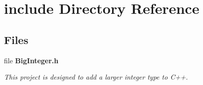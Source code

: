 \section{include Directory Reference}
\label{dir_d44c64559bbebec7f509842c48db8b23}
\subsection*{Files}
\begin{DoxyCompactItemize}
\item 
file \textbf{ Big\+Integer.\+h}
\begin{DoxyCompactList}\small\item\em This project is designed to add a larger integer type to C++. \end{DoxyCompactList}\end{DoxyCompactItemize}
